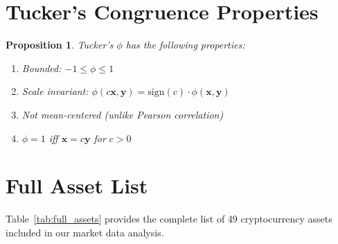\documentclass[11pt,twocolumn]{article}
\newtheorem{proposition}{Proposition}
\begin{document}
\section{Tucker's Congruence Properties}
\label{app:congruence}

\begin{proposition}
Tucker's $\phi$ has the following properties:
\begin{enumerate}
    \item Bounded: $-1 \leq \phi \leq 1$
    \item Scale invariant: $\phi(c\mathbf{x}, \mathbf{y}) = \text{sign}(c) \cdot \phi(\mathbf{x}, \mathbf{y})$
    \item Not mean-centered (unlike Pearson correlation)
    \item $\phi = 1$ iff $\mathbf{x} = c\mathbf{y}$ for $c > 0$
\end{enumerate}
\end{proposition}

\section{Full Asset List}
\label{app:assets}

Table~\ref{tab:full_assets} provides the complete list of 49 cryptocurrency assets included in our market data analysis.
\end{document}
